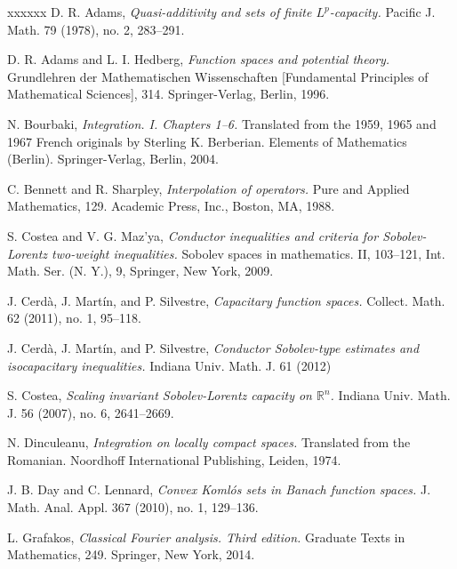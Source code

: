 \documentclass[10pt,reqno]{amsart}
\numberwithin{equation}{section}
\begin{document}



\begin{thebibliography}{xxxxxx}
 D. R. Adams, {\it Quasi-additivity and sets of finite $L^{p}$-capacity.} Pacific J. Math. 79 (1978), no. 2, 283–291.

 D. R. Adams and L. I. Hedberg, {\it Function spaces and potential theory.} Grundlehren der Mathematischen Wissenschaften [Fundamental Principles of Mathematical Sciences], 314. Springer-Verlag, Berlin, 1996.

 N. Bourbaki, {\it Integration. I. Chapters 1–6.} Translated from the 1959, 1965 and 1967 French originals by Sterling K. Berberian. Elements of Mathematics (Berlin). Springer-Verlag, Berlin, 2004.

 C. Bennett and R. Sharpley, {\it Interpolation of operators.} Pure and Applied Mathematics, 129. Academic Press, Inc., Boston, MA, 1988.

 S. Costea and V. G. Maz'ya, {\it Conductor inequalities and criteria for Sobolev-Lorentz two-weight inequalities.} Sobolev spaces in mathematics. II, 103–121, Int. Math. Ser. (N. Y.), 9, Springer, New York, 2009.

 J. Cerd\`a, J. Mart\'in, and P. Silvestre, {\it Capacitary function spaces.} Collect. Math. 62 (2011), no. 1, 95–118.

 J. Cerd\`a, J. Mart\'in, and P. Silvestre, {\it Conductor Sobolev-type estimates and isocapacitary inequalities.} Indiana Univ. Math. J. 61 (2012)

 S. Costea, {\it Scaling invariant Sobolev-Lorentz capacity on $\mathbb{R}^{n}$.}  Indiana Univ. Math. J. 56 (2007), no. 6, 2641–2669.

 N. Dinculeanu, {\it Integration on locally compact spaces.} Translated from the Romanian. Noordhoff International Publishing, Leiden, 1974.

 J. B. Day and C. Lennard, {\it Convex Komlós sets in Banach function spaces.} J. Math. Anal. Appl. 367 (2010), no. 1, 129–136.

 L. Grafakos, {\it Classical Fourier analysis. Third edition.} Graduate Texts in Mathematics, 249. Springer, New York, 2014. 


\end{thebibliography}
\end{document}
